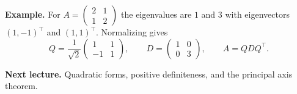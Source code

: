 \documentclass[11pt]{article}
\begin{document}
\textbf{Example.} For
$A = \begin{pmatrix} 2 & 1 \\ 1 & 2 \end{pmatrix}$ the eigenvalues are
$1$ and $3$ with eigenvectors $(1,-1)^{\top}$ and $(1,1)^{\top}$.
Normalizing gives
\[
  Q = \frac{1}{\sqrt{2}}\begin{pmatrix} 1 & 1 \\ -1 & 1 \end{pmatrix},
  \qquad
  D = \begin{pmatrix} 1 & 0 \\ 0 & 3 \end{pmatrix},
  \qquad A = QDQ^{\top}.
\]

\textbf{Next lecture.} Quadratic forms, positive definiteness, and the
principal axis theorem.
\end{document}
